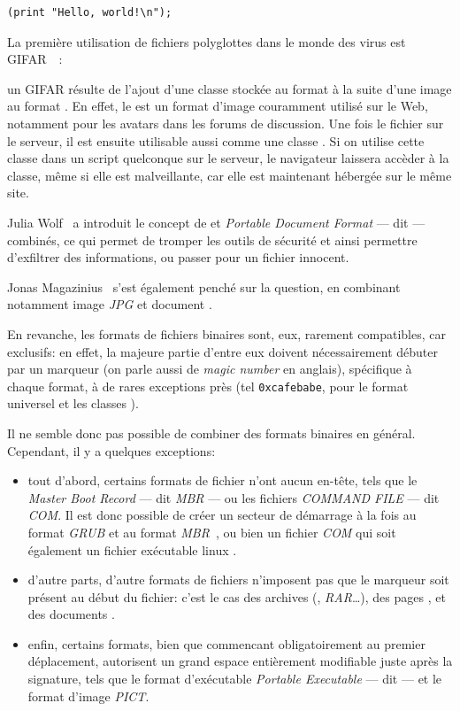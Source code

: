 \begin{lstlisting}[language={},caption={Un programme polyglotte simple.},label={lst:albertini:polyglot}]
 (print "Hello, world!\n");
\end{lstlisting}

La première utilisation de fichiers polyglottes dans le monde des virus est GIFAR~\cite{albertini:wikipedia:gifar}~:

un GIFAR résulte de l'ajout d'une classe \JAVA stockée au format \JAR à la suite d'une image au format \GIF. En effet, le \GIF est un format d'image couramment utilisé sur le Web, notamment pour les avatars dans les forums de discussion. Une fois le fichier sur le serveur, il est ensuite utilisable aussi comme une classe \JAVA. Si on utilise cette classe dans un script quelconque sur le serveur, le navigateur laissera accèder à la classe, même si elle est malveillante, car elle est maintenant hébergée sur le même site.

Julia Wolf~\cite{albertini:wolf:omgwtfpdf} a introduit le concept de \ZIP et \emph{Portable Document Format} --- dit \PDF --- combinés, ce qui permet de tromper les outils de sécurité et ainsi permettre d'exfiltrer des informations, ou passer pour un fichier innocent.

Jonas Magazinius~\cite{albertini:magazinius:polyglots} s'est également penché sur la question, en combinant notamment image \emph{JPG} et document \PDF.

En revanche, les formats de fichiers binaires sont, eux, rarement compatibles, car exclusifs: en effet, la majeure partie d'entre eux doivent nécessairement débuter par un marqueur (on parle aussi de \emph{magic number} en anglais), spécifique à chaque format, à de rares exceptions près (tel {\tt 0xcafebabe}, pour le format \MACHO universel et les classes \JAVA).

Il ne semble donc pas possible de combiner des formats binaires en général. Cependant, il y a quelques exceptions:
\begin {itemize}
\item tout d'abord, certains formats de fichier n'ont aucun en-tête, tels que le \emph{Master Boot Record} --- dit \emph{MBR} --- ou les fichiers \emph{COMMAND FILE} --- dit \emph{COM}. Il est donc possible de créer un secteur de démarrage à la fois au format \emph{GRUB} et au format \emph{MBR}~\cite{albertini:scott:metalkiller}, ou bien un fichier \emph{COM} qui soit également un fichier exécutable linux \ELF.

\item d'autre parts, d'autre formats de fichiers n'imposent pas que le marqueur soit présent au début du fichier: c'est le cas des archives (\ZIP, \emph{RAR}\ldots), des pages \HTML, et des documents \PDF.

\item enfin, certains formats, bien que commencant obligatoirement au premier déplacement, autorisent un grand espace entièrement modifiable juste après la signature, tels que le format d'exécutable \emph{Portable Executable} --- dit \PE --- et le format d'image \emph{PICT}.
\end{itemize}

